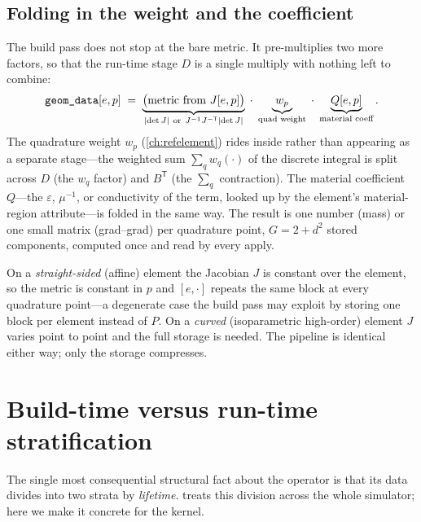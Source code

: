 \subsection{Folding in the weight and the coefficient}

The build pass does not stop at the bare metric. It pre-multiplies two more
factors, so that the run-time stage $D$ is a single multiply with nothing left to
combine:
\begin{equation}
  \texttt{geom\_data}[e,p] \;=\;
    \underbrace{\bigl(\text{metric from } J[e,p]\bigr)}_{\abs{\det J}\ \text{or}\ J^{-1}J^{-\mathsf T}\abs{\det J}}
    \;\cdot\;
    \underbrace{w_p}_{\text{quad weight}}
    \;\cdot\;
    \underbrace{Q[e,p]}_{\text{material coeff}}.
  \label{eq:appk-geomdata}
\end{equation}
The quadrature weight $w_p$ (\cref{ch:refelement}) rides inside 
rather than appearing as a separate stage---the weighted sum
$\sum_q w_q(\cdot)$ of the discrete integral is split across $D$ (the $w_q$ factor)
and $B^{\mathsf T}$ (the $\sum_q$ contraction). The material coefficient $Q$---the
$\varepsilon$, $\mu^{-1}$, or conductivity of the term, looked up by the element's
material-region attribute---is folded in the same way. The result is one number
(mass) or one small matrix (grad--grad) per quadrature point, $G=2+d^2$ stored
components, computed once and read by every apply.

\begin{remark}
On a \emph{straight-sided} (affine) element the Jacobian $J$ is constant over the
element, so the metric is constant in $p$ and $[e,\cdot]$ repeats
the same block at every quadrature point---a degenerate case the build pass may
exploit by storing one block per element instead of $P$. On a \emph{curved}
(isoparametric high-order) element $J$ varies point to point and the full
\code{[(E, P, G)]} storage is needed. The pipeline is identical either way; only
the storage compresses.
\end{remark}

\section{Build-time versus run-time stratification}
\label{sec:appk-strata}

The single most consequential structural fact about the operator is that its data
divides into two strata by \emph{lifetime}.  treats this division
across the whole simulator; here we make it concrete for the kernel.

